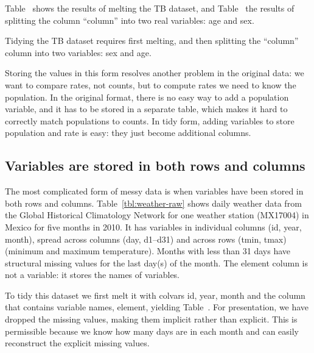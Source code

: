 \documentclass[article]{jss}
\begin{document}
Table~ shows the results of melting the TB dataset, and Table~ the results of splitting the column ``column'' into two real variables: age and sex.  

\begin{table}[htbp]
  \centering
  \hspace{2em}%
  
  \caption{Tidying the TB dataset requires first melting, and then splitting the ``column'' column into two variables: sex and age.}
  \label{tbl:tb-clean}
\end{table}

Storing the values in this form resolves another problem in the original data: we want to compare rates, not counts, but to compute rates we need to know the population. In the original format, there is no easy way to add a population variable, and it has to be stored in a separate table, which makes it hard to correctly match populations to counts. In tidy form, adding variables to store population and rate is easy: they just become additional columns.

\subsection{Variables are stored in both rows and columns}

The most complicated form of messy data is when variables have been stored in both rows and columns. Table~\ref{tbl:weather-raw} shows daily weather data from the Global Historical Climatology Network for one weather station (MX17004) in Mexico for five months in 2010. It has variables in individual columns (id, year, month), spread across columns (day, d1--d31) and across rows (tmin, tmax) (minimum and maximum temperature). Months with less than 31 days have structural missing values for the last day(s) of the month. The element column is not a variable: it stores the names of variables.

To tidy this dataset we first melt it with colvars id, year, month and the column that contains variable names, element, yielding Table~. For presentation, we have dropped the missing values, making them implicit rather than explicit. This is permissible because we know how many days are in each month and can easily reconstruct the explicit missing values.
\end{document}
